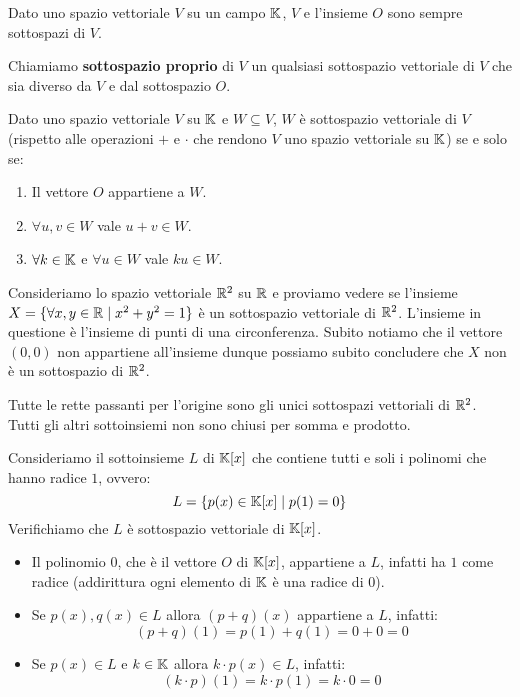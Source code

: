 \begin{example}
	Dato uno spazio vettoriale $V$ su un campo $\mathbb{K}$, $V$ e l'insieme ${O}$ sono sempre sottospazi di $V$.
\end{example}

\begin{definition}
	Chiamiamo \textbf{sottospazio proprio} di $V$ un qualsiasi sottospazio vettoriale di $V$ che sia diverso da
	$V$ e dal sottospazio ${O}$.
\end{definition}

\begin{proposition}
	Dato uno spazio vettoriale $V$ su $\mathbb{K}$ e $W \subseteq V$, $W$ è sottospazio vettoriale di $V$
	(rispetto alle operazioni $+$ e $\cdot$ che rendono $V$ uno spazio vettoriale su $\mathbb{K}$) se e solo
	se:
	\begin{enumerate}
		\item Il vettore $O$ appartiene a $W$.
		\item $\forall u, v \in W$ vale $u + v \in W$.
		\item $\forall k \in \mathbb{K}$ e $\forall u \in W$ vale $ku \in W$.
	\end{enumerate}
\end{proposition}

\begin{example}
	Consideriamo lo spazio vettoriale $\mathbb{R}^2$ su $\mathbb{R}$ e proviamo vedere se l'insieme
	$X = \{\forall x,y \in \mathbb{R} \mid x^2 + y^2 = 1\}$ è un sottospazio vettoriale di $\mathbb{R}^2$.
	L'insieme in questione è l'insieme di punti di una circonferenza. Subito notiamo che il vettore $(0, 0)$
	non appartiene all'insieme dunque possiamo subito concludere che $X$ non è un sottospazio di
	$\mathbb{R}^2$.
\end{example}

\begin{observation}
	Tutte le rette passanti per l'origine sono gli unici sottospazi vettoriali di $\mathbb{R}^2$. Tutti gli altri
	sottoinsiemi non sono chiusi per somma e prodotto.
\end{observation}

\begin{example}
	Consideriamo il sottoinsieme $L$ di $\mathbb{K}[x]$ che contiene tutti e soli i polinomi che hanno radice
	$1$, ovvero:
	\[ L = \{p(x) \in \mathbb{K}[x] \mid p(1) = 0\} \]
	Verifichiamo che $L$ è sottospazio vettoriale di $\mathbb{K}[x]$.
	\begin{itemize}
		\item Il polinomio $0$, che è il vettore $O$ di $\mathbb{K}[x]$, appartiene a $L$, infatti ha $1$
		      come radice (addirittura ogni elemento di $\mathbb{K}$ è una radice di $0$).
		\item Se $p(x), q(x) \in L$ allora $(p + q)(x)$ appartiene a $L$, infatti:
		      \[ (p + q)(1) = p(1) + q(1) = 0 + 0 = 0 \]
		\item Se $p(x) \in L$ e $k \in \mathbb{K}$ allora $k \cdot p(x) \in L$, infatti:
		      \[ (k \cdot p)(1) = k \cdot p(1) = k \cdot 0 = 0 \]
	\end{itemize}
\end{example}

